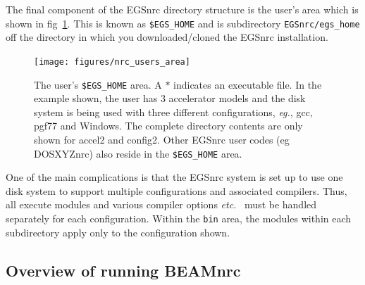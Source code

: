 \documentclass[12pt,twoside]{article}
\newcommand{\etc}{{\em etc.}}
\newcommand{\eg}{{\em eg.}}
\begin{document}
The final component of the EGSnrc directory structure is the user's area which
is shown in fig~\ref{fig_users_area}.  This is known as {\tt \$EGS\_HOME}
and is subdirectory {\tt EGSnrc/egs\_home} off the directory in which you
downloaded/cloned the EGSnrc installation.
\begin{figure}[hbpt]
\leavevmode
\begin{center}
\mbox{}\hspace{0cm}
\texttt{[image: figures/nrc\_users\_area]}
  \caption[The user's \$EGS\_HOME area.]{The user's {\tt \$EGS\_HOME}
  area.  A $*$ indicates an executable
  file. In the example shown, the user has 3 accelerator models and the
  disk system is being used with three different configurations, \eg, gcc,
  pgf77 and Windows.  The complete directory contents are only shown
  for accel2 and config2.  Other EGSnrc user codes (eg DOSXYZnrc) also
  reside in the {\tt \$EGS\_HOME} area.}
\label{fig_users_area}
\end{center}
\end{figure}
One of the main complications is that the
EGSnrc system is
set up to use one disk system to support multiple configurations and
associated compilers.
Thus, all execute modules and various compiler options
\etc~ must be handled separately for each configuration.
Within the \verb+bin+ area, the modules within
each subdirectory apply only to the configuration shown.

\subsection{Overview of running BEAMnrc}
\end{document}
